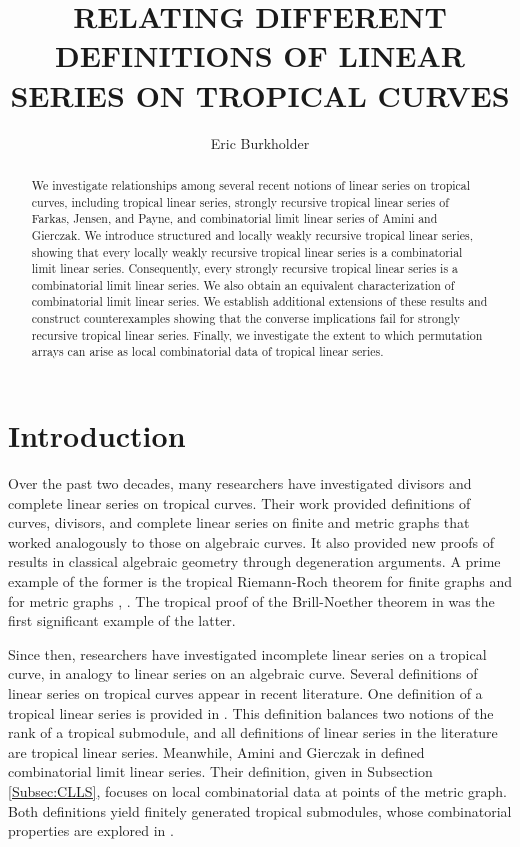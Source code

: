 \documentclass{amsart}
\title{RELATING DIFFERENT DEFINITIONS OF LINEAR SERIES ON TROPICAL CURVES}
\author{Eric Burkholder}
\begin{document}
 
	
	
	\begin{abstract}
		We investigate relationships among several recent notions of linear series on tropical curves, including tropical linear series, strongly recursive tropical linear series of Farkas, Jensen, and Payne, and combinatorial limit linear series of Amini and Gierczak. We introduce structured and locally weakly recursive tropical linear series, showing that every locally weakly recursive tropical linear series is a combinatorial limit linear series. Consequently, every strongly recursive tropical linear series is a combinatorial limit linear series. We also obtain an equivalent characterization of combinatorial limit linear series. We establish additional extensions of these results and construct counterexamples showing that the converse implications fail for strongly recursive tropical linear series. Finally, we investigate the extent to which permutation arrays can arise as local combinatorial data of tropical linear series.
	\end{abstract}
	
	\maketitle
	
	\section{Introduction}
	\label{Sec:intro}
	
	Over the past two decades, many researchers have investigated divisors and complete linear series on tropical curves. Their work provided definitions of curves, divisors, and complete linear series on finite and metric graphs that worked analogously to those on algebraic curves. It also provided new proofs of results in classical algebraic geometry through degeneration arguments. A prime example of the former is the tropical Riemann-Roch theorem for finite graphs \cite{baker2007riemann} and for metric graphs \cite{gathmann2008riemann}, \cite{mikhalkin2008tropical}. The tropical proof of the Brill-Noether theorem in \cite{cools2012tropical} was the first significant example of the latter.
	
	Since then, researchers have investigated incomplete linear series on a tropical curve, in analogy to linear series on an algebraic curve. Several definitions of linear series on tropical curves appear in recent literature. One definition of a tropical linear series is provided in \cite{chang2025matroidal}. This definition balances two notions of the rank of a tropical submodule, and all definitions of linear series in the literature are tropical linear series. Meanwhile, Amini and Gierczak in \cite{amini2022limit} defined combinatorial limit linear series. Their definition, given in Subsection \ref{Subsec:CLLS}, focuses on local combinatorial data at points of the metric graph. Both definitions yield finitely generated tropical submodules, whose combinatorial properties are explored in \cite{luo2018idempotent}.
	
\end{document}
